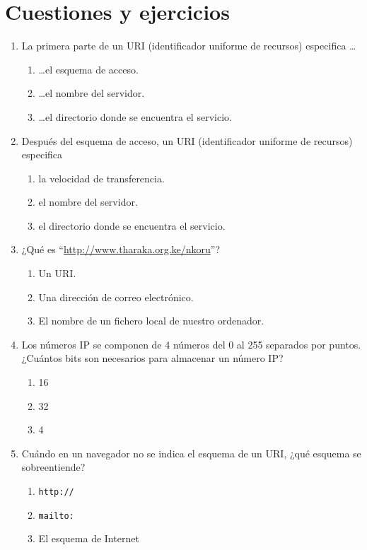 \section{Cuestiones y ejercicios} \begin{enumerate} 

\item La primera parte de un URI (identificador uniforme de recursos) especifica \ldots\begin{enumerate} \item \ldots el esquema de acceso. \item \ldots el nombre del servidor. \item \ldots el directorio donde se encuentra el servicio. \end{enumerate} 

\item Después del esquema de acceso, un URI (identificador uniforme de recursos) especifica \begin{enumerate} \item la velocidad de transferencia. \item el nombre del servidor. \item el directorio donde se encuentra el servicio. \end{enumerate} 

\item ¿Qué es ``\url{http://www.tharaka.org.ke/nkoru}''? \begin{enumerate} \item Un URI. \item Una dirección de correo electrónico. \item El nombre de un fichero local de nuestro ordenador. \end{enumerate} 

\item Los números IP se componen de 4 números del 0 al 255 separados por puntos. ¿Cuántos bits son necesarios para almacenar un número IP? \begin{enumerate} \item 16 \item 32 \item 4 \end{enumerate} 

\item Cuándo en un navegador no se indica el esquema de un URI, ¿qué esquema se sobreentiende? \begin{enumerate} \item \texttt{http://} \item \texttt{mailto:} \item El esquema de Internet \end{enumerate} 


\end{enumerate}
